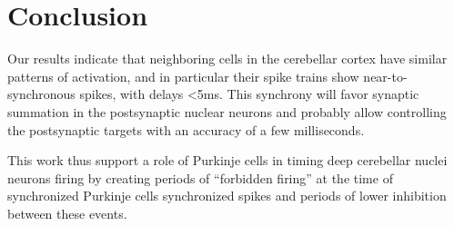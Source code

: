 \section{Conclusion}

Our results indicate that neighboring cells in the cerebellar cortex have similar patterns of activation, and in particular their spike trains show near-to-synchronous spikes, with delays <5ms. This synchrony will favor synaptic summation in the postsynaptic nuclear neurons and probably allow controlling the postsynaptic targets with an accuracy of a few milliseconds.

This work thus support a role of Purkinje cells in timing deep cerebellar nuclei neurons firing by creating periods of ``forbidden firing'' at the time of synchronized Purkinje cells synchronized spikes and periods of lower inhibition between these events.
